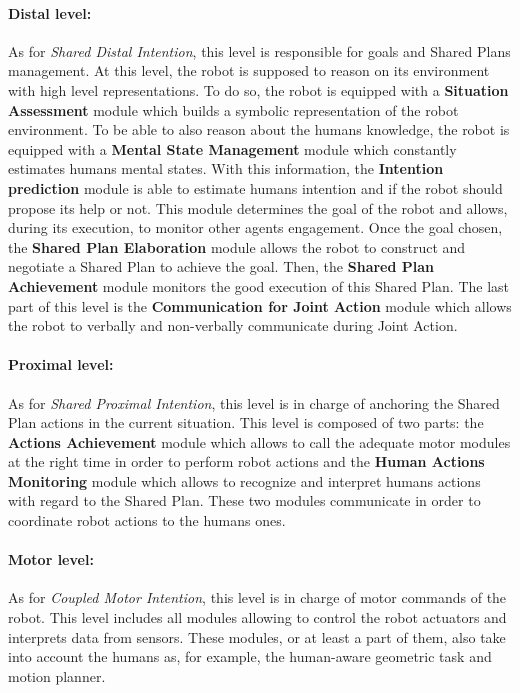 \documentclass[english,a4paper,11pt,twoside]{StyleThese}
\begin{document}
\paragraph{Distal level:}
As for \textit{Shared Distal Intention}, this level is responsible for goals and Shared Plans management. At this level, the robot is supposed to reason on its environment with high level representations. To do so, the robot is equipped with a \textbf{Situation Assessment} module which builds a symbolic representation of the robot environment. To be able to also reason about the humans knowledge, the robot is equipped with a \textbf{Mental State Management} module which constantly estimates humans mental states. With this information, the \textbf{Intention prediction} module is able to estimate humans intention and if the robot should propose its help or not. This module determines the goal of the robot and allows, during its execution, to monitor other agents engagement. Once the goal chosen, the \textbf{Shared Plan Elaboration} module allows the robot to construct and negotiate a Shared Plan to achieve the goal. Then, the \textbf{Shared Plan Achievement} module monitors the good execution of this Shared Plan. The last part of this level is the \textbf{Communication for Joint Action} module which allows the robot to verbally and non-verbally communicate during Joint Action. 

\paragraph{Proximal level:}
As for \textit{Shared Proximal Intention}, this level is in charge of anchoring the Shared Plan actions in the current situation. This level is composed of two parts: the \textbf{Actions Achievement} module which allows to call the adequate motor modules at the right time in order to perform robot actions and the \textbf{Human Actions Monitoring} module which allows to recognize and interpret humans actions with regard to the Shared Plan. These two modules communicate in order to coordinate robot actions to the humans ones.

\paragraph{Motor level:}
As for \textit{Coupled Motor Intention}, this level is in charge of motor commands of the robot. This level includes all modules allowing to control the robot actuators and interprets data from sensors. These modules, or at least a part of them, also take into account the humans as, for example, the human-aware geometric task and motion planner.

\ifdefined{}
\else


\end{document}
